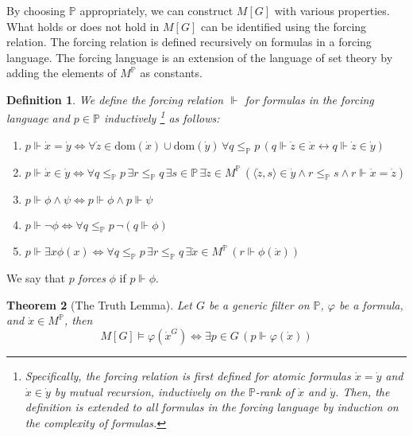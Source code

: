 \documentclass{report}
\newtheorem{thm}{Theorem}[section]
\newtheorem{dfn}[thm]{Definition}
\begin{document}
By choosing $\mathbb{P}$ appropriately, we can construct $M[G]$ with various properties.
What holds or does not hold in $M[G]$ can be identified using the forcing relation.
The forcing relation is defined recursively on formulas in a forcing language.
The forcing language is an extension of the language of set theory by adding the elements of $M^{\mathbb{P}}$ as constants.
\begin{dfn} \label{dfn:forcing_relation}
  We define the \emph{forcing relation} $\Vdash$ for formulas in the forcing language and $p \in \mathbb{P}$ inductively
  \footnote{
    Specifically, the forcing relation is first defined for atomic formulas $\dot{x} = \dot{y}$ and $\dot{x} \in \dot{y}$ by mutual recursion,
    inductively on the $\mathbb{P}$-rank of $\dot{x}$ and $\dot{y}$.
    Then, the definition is extended to all formulas in the forcing language by induction on the complexity of formulas.
  }
  as follows:
  \begin{enumerate}
    \item $p \Vdash \dot{x} = \dot{y} \Leftrightarrow \forall \dot{z} \in \mathrm{dom}(\dot{x}) \cup \mathrm{dom}(\dot{y})\,
\forall q \leq_{\mathbb{P}} p \, (q \Vdash \dot{z} \in \dot{x} \leftrightarrow q \Vdash \dot{z} \in \dot{y})$
    \item $p \Vdash \dot{x} \in \dot{y} \Leftrightarrow \forall q \leq_{\mathbb{P}} p\, \exists r \leq_{\mathbb{P}} q \, 
    \exists s \in \mathbb{P} \, \exists \dot{z} \in M^{\mathbb{P}} \, (\langle \dot{z}, s \rangle \in \dot{y} \land r \leq_{\mathbb{P}} s \land r \Vdash \dot{x} = \dot{z} )$
    \item $p \Vdash \phi \land \psi \Leftrightarrow p \Vdash \phi \land p \Vdash \psi$
    \item $p \Vdash \neg \phi \Leftrightarrow \forall q \leq_{\mathbb{P}} p \, \neg (q \Vdash \phi)$
    \item $p \Vdash \exists x \phi(x) \Leftrightarrow \forall q \leq_{\mathbb{P}} p \, \exists r \leq_{\mathbb{P}} q \, \exists \dot{x} \in M^{\mathbb{P}} \, (r \Vdash \phi(\dot{x}))$
  \end{enumerate}
\end{dfn}
We say that $p$ \emph{forces} $\phi$ if $p \Vdash \phi$.

\begin{thm}[The Truth Lemma] \label{thm:truth_lemma}
  Let $G$ be a generic filter on $\mathbb{P}$, $\varphi$ be a formula, and $\dot{x} \in M^{\mathbb{P}}$, then 
  $$M[G] \vDash \varphi(\dot{x}^G) \Leftrightarrow \exists p \in G \, (p \Vdash \varphi(\dot{x}))$$
\end{thm}
\end{document}
